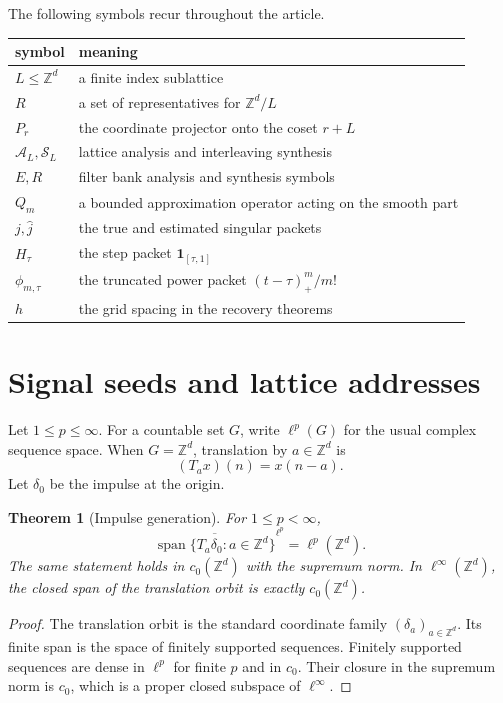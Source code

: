 \documentclass{aomart}
\newtheorem{theorem}{Theorem}[section]
\theoremstyle{definition}
\theoremstyle{remark}
\newcommand{\ZZ}{\mathbb Z}
\newcommand{\Acal}{\mathcal A}
\newcommand{\Scal}{\mathcal S}
\newcommand{\one}{\mathbf 1}
\newcommand{\Span}{\operatorname{span}}
\begin{document}
The following symbols recur throughout the article.
\begin{center}
\begin{tabular}{p{}p{}}
\toprule
symbol & meaning\\
\midrule
\(L\leq\ZZ^d\) & a finite index sublattice\\
\(R\) & a set of representatives for \(\ZZ^d/L\)\\
\(P_r\) & the coordinate projector onto the coset \(r+L\)\\
\(\Acal_L,\Scal_L\) & lattice analysis and interleaving synthesis\\
\(E,R\) & filter bank analysis and synthesis symbols\\
\(Q_m\) & a bounded approximation operator acting on the smooth part\\
\(j,\widehat j\) & the true and estimated singular packets\\
\(H_\tau\) & the step packet \(\one_{[\tau,1]}\)\\
\(\phi_{m,\tau}\) & the truncated power packet \((t-\tau)_+^m/m!\)\\
\(h\) & the grid spacing in the recovery theorems\\
\bottomrule
\end{tabular}
\end{center}

\section{Signal seeds and lattice addresses}\label{sec:signal_seeds}

Let \(1\leq p\leq\infty\). For a countable set \(G\), write \(\ell^p(G)\) for the usual complex sequence space. When \(G=\ZZ^d\), translation by \(a\in\ZZ^d\) is
\[
(T_ax)(n)=x(n-a).
\]
Let \(\delta_0\) be the impulse at the origin.

\begin{theorem}[Impulse generation]\label{thm:impulse_generation}
For \(1\leq p<\infty\),
\[
\overline{\Span\{T_a\delta_0:a\in\ZZ^d\}}^{\ell^p}
=
\ell^p(\ZZ^d).
\]
The same statement holds in \(c_0(\ZZ^d)\) with the supremum norm. In \(\ell^\infty(\ZZ^d)\), the closed span of the translation orbit is exactly \(c_0(\ZZ^d)\).
\end{theorem}

\begin{proof}
The translation orbit is the standard coordinate family \((\delta_a)_{a\in\ZZ^d}\). Its finite span is the space of finitely supported sequences. Finitely supported sequences are dense in \(\ell^p\) for finite \(p\) and in \(c_0\). Their closure in the supremum norm is \(c_0\), which is a proper closed subspace of \(\ell^\infty\).
\end{proof}
\end{document}
